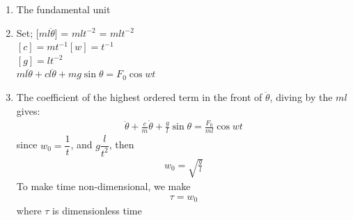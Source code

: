 \documentclass[11pt]{report}
\newcommand{\spn}[1]{\\[#1cm]}
\begin{document}
	\begin{enumerate}
		\item The fundamental unit\spn{0.5}
		\item Set; [$ml\ddot{\theta}$] = $mlt^{-2}$ \quad [$F_0$] = $mlt^{-2}$\\
		\hspace*{0.3cm} $[c] = mt^{-1}$\qquad\qquad $[w] = t^{-1}$\\
		\hspace*{0.4cm} $[g] = lt^{-2}$\\
		\hspace*{0.4cm} $ml\ddot{\theta} + cl\ddot{\theta} + mg\sin\theta = F_0\cos wt$
		
		\item The coefficient of the highest ordered term in the front of $\ddot{\theta}$, diving by the $ml$ gives:
		\begin{eqnarray*}
			\ddot{\theta} + \frac{c}{m}\dot{\theta} + \frac{g}{l}\sin \theta = \frac{F_0}{ml}\cos wt
		\end{eqnarray*}
		since $w_0 = \dfrac{1}{t}$, and $g\dfrac{l}{t^2}$, then
		\begin{eqnarray*}
			w_0 = \sqrt{\frac{g}{l}}
		\end{eqnarray*}
		To make time non-dimensional, we make
		\begin{eqnarray*}
			\tau = w_0
		\end{eqnarray*}
		where $\tau$ is dimensionless time
		

\end{enumerate}
\end{document}
